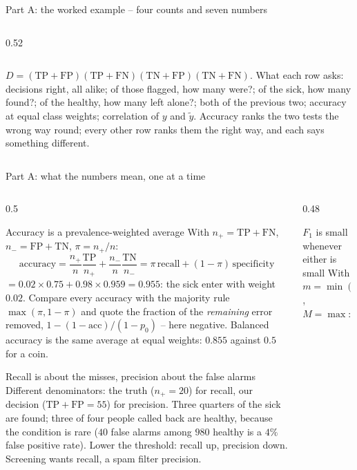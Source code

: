 \documentclass[10pt,aspectratio=169]{beamer}
\begin{document}
\begin{frame}{Part A: the worked example -- four counts and seven numbers}
\begin{columns}[T]
\begin{column}{0.52\textwidth}
\begin{center}
\begin{tabular}{@{}llcc@{}}
\bottomrule
\end{tabular}
\end{center}
\scriptsize
$D=(\mathrm{TP}+\mathrm{FP})(\mathrm{TP}+\mathrm{FN})(\mathrm{TN}+\mathrm{FP})(\mathrm{TN}+\mathrm{FN})$.
What each row asks: decisions right, all alike; of those flagged, how many
were?; of the sick, how many found?; of the healthy, how many left alone?;
both of the previous two; accuracy at equal class weights; correlation of
$y$ and $\tilde y$.  Accuracy ranks the two tests the wrong way round;
every other row ranks them the right way, and each says something
different.
\end{column}
\end{columns}
\end{frame}

\begin{frame}{Part A: what the numbers mean, one at a time}
\scriptsize
\begin{columns}[T]
\begin{column}{0.5\textwidth}
\begin{block}{Accuracy is a prevalence-weighted average}
With $n_+=\mathrm{TP}+\mathrm{FN}$, $n_-=\mathrm{FP}+\mathrm{TN}$,
$\pi=n_+/n$:
\[
  \mathrm{accuracy}=\frac{n_+}{n}\frac{\mathrm{TP}}{n_+}+\frac{n_-}{n}\frac{\mathrm{TN}}{n_-}
  =\pi\,\mathrm{recall}+(1-\pi)\,\mathrm{specificity}
\]
$=0.02\times0.75+0.98\times0.959=0.955$: the sick enter with weight
$0.02$.  Compare every accuracy with the majority rule $\max(\pi,1-\pi)$
and quote the fraction of the \emph{remaining} error removed,
$1-(1-\mathrm{acc})/(1-p_0)$ -- here negative.  Balanced accuracy is the
same average at equal weights: $0.855$ against $0.5$ for a coin.
\end{block}
\begin{block}{Recall is about the misses, precision about the false alarms}
Different denominators: the truth ($n_+=20$) for recall, our decision
($\mathrm{TP}+\mathrm{FP}=55$) for precision.  Three quarters of the sick
are found; three of four people called back are healthy, because the
condition is rare ($40$ false alarms among $980$ healthy is a $4\%$ false
positive rate).  Lower the threshold: recall up, precision down.  Screening
wants recall, a spam filter precision.
\end{block}
\end{column}
\begin{column}{0.48\textwidth}
\begin{block}{$F_1$ is small whenever either is small}
With $m=\min(\mathrm{prec},\mathrm{rec})$, $M=\max$:

\end{block}
\end{column}
\end{columns}
\end{frame}
\end{document}
